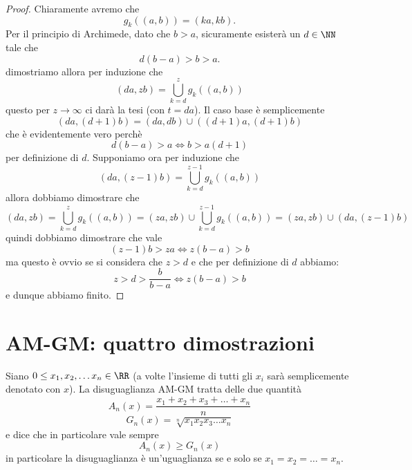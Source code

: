 \documentclass[11pt]{scrartcl}
\begin{document}
  	\begin{proof}
  		Chiaramente avremo che
  		$$g_k((a,b))=(ka,kb).$$
  		Per il principio di Archimede, dato che $b>a$, sicuramente esisterà un $d\in\NN$ tale che
  		$$d(b-a)>b>a.$$
  		dimostriamo allora per induzione che 
  		$$(da,zb)=\bigcup_{k=d}^z g_k((a,b))$$ 
  		questo per $z\to\infty$ ci darà la tesi (con $t=da$). Il caso base è semplicemente
  		$$(da,(d+1)b)=(da,db)\cup((d+1)a,(d+1)b)$$
  		che è evidentemente vero perchè 
  		$$d(b-a)>a \iff b>a(d+1)$$
  		per definizione di $d$. Supponiamo ora per induzione che
  		$$(da,(z-1)b)=\bigcup_{k=d}^{z-1}g_k((a,b))$$
  		allora dobbiamo dimostrare che 
  		$$(da,zb)=\bigcup_{k=d}^{z}g_k((a,b))=(za,zb)\cup\bigcup_{k=d}^{z-1}g_k((a,b))=(za,zb)\cup (da,(z-1)b)$$
  		quindi dobbiamo dimostrare che vale
  		$$(z-1)b>za \iff z(b-a)>b$$
  		ma questo è ovvio se si considera che $z>d$ e che per definizione di $d$ abbiamo:
  		$$z>d>\frac{b}{b-a} \iff z(b-a)>b$$
  		e dunque abbiamo finito.
  	\end{proof}
  	
  	\newpage
  	
  	\section{AM-GM: quattro dimostrazioni}
  	Siano $0\le x_1,x_2,\dots x_n\in\RR$ (a volte l'insieme di tutti gli $x_i$ sarà semplicemente denotato con $x$). La disuguaglianza AM-GM tratta delle due quantità
  	$$A_n(x)=\frac{x_1+x_2+x_3+\dots+x_n}{n}$$
  	$$G_n(x)=\sqrt[n]{x_1x_2x_3\dots x_n}$$
  	e dice che in particolare vale sempre
  	$$A_n(x)\ge G_n(x)$$
  	in particolare la disuguaglianza è un'uguaglianza se e solo se $x_1=x_2=\dots=x_n$.
\end{document}
